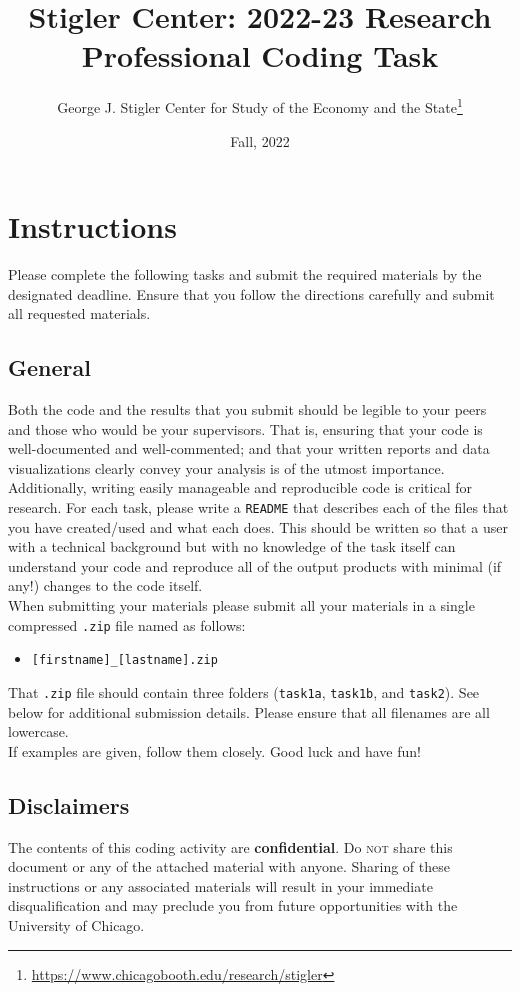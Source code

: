 \documentclass[11pt, letterpaper, twoside]{article}
\title{\textbf{Stigler Center: 2022-23 Research Professional Coding Task}}
\date{Fall, 2022}
\author{George J. Stigler Center for Study of the Economy and the State\thanks{\href{https://www.chicagobooth.edu/research/stigler}{https://www.chicagobooth.edu/research/stigler}}}
\begin{document}
\maketitle

\section*{Instructions}
Please complete the following tasks and submit the required materials by the designated deadline. Ensure that you follow the directions carefully and submit all requested materials.

\subsection*{General}
Both the code and the results that you submit should be legible to your peers and those who would be your supervisors. That is, ensuring that your code is well-documented and well-commented; and that your written reports and data visualizations clearly convey your analysis is of the utmost importance.\\

Additionally, writing easily manageable and reproducible code is critical for research. For each task, please write a \verb|README| that describes each of the files that you have created/used and what each does. This should be written so that a user with a technical background but with no knowledge of the task itself can understand your code and reproduce all of the output products with minimal (if any!) changes to the code itself.\\

When submitting your materials please submit all your materials in a single compressed \verb|.zip| file named as follows:
\begin{itemize}
    \item \verb|[firstname]_[lastname].zip|
\end{itemize}
That \verb|.zip| file should contain three folders (\verb|task1a|, \verb|task1b|, and \verb|task2|). See below for additional submission details. Please ensure that all filenames are all lowercase.\\

If examples are given, follow them closely. Good luck and have fun!

\subsection*{Disclaimers}
The contents of this coding activity are \textbf{confidential}. Do \textsc{not} share this document or any of the attached material with anyone. Sharing of these instructions or any associated materials will result in your immediate disqualification and may preclude you from future opportunities with the University of Chicago.
\end{document}
